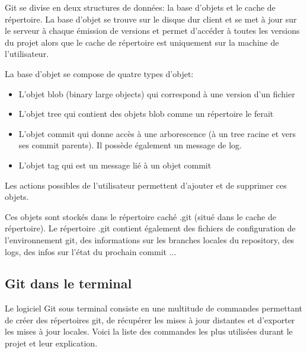Git se divise en deux structures de données: la base d’objets et le cache de répertoire. La base d’objet se trouve sur le disque dur client et se met à jour sur le serveur à chaque émission de versions et permet d’accéder à toutes les versions du projet alors que le cache de répertoire est uniquement sur la machine de l’utilisateur.

\noindent La base d’objet se compose de quatre types d’objet:
\begin{itemize} 
	\item         L’objet blob (binary large objects) qui correspond à une version d’un fichier
	\item         L’objet tree qui contient des objets blob comme un répertoire le ferait
	\item         L’objet commit qui donne accès à une arborescence (à un tree racine et vers ses commit parents). Il possède également un message de log.
	\item         L’objet tag qui est un message lié à un objet commit
\end{itemize}

Les actions possibles de l’utilisateur permettent d’ajouter et de supprimer ces objets.

Ces objets sont stockés dans le répertoire caché .git (situé dans le cache de répertoire). Le répertoire .git contient également des fichiers de configuration de l’environnement git, des informations sur les branches locales du repository, des logs, des infos sur l’état du prochain commit ...

\subsection{Git dans le terminal}
Le logiciel Git sous terminal consiste en une multitude de commandes permettant de créer des répertoires git, de récupérer les mises à jour distantes et d’exporter les mises à jour locales. Voici la liste des commandes les plus utilisées durant le projet et leur explication.

